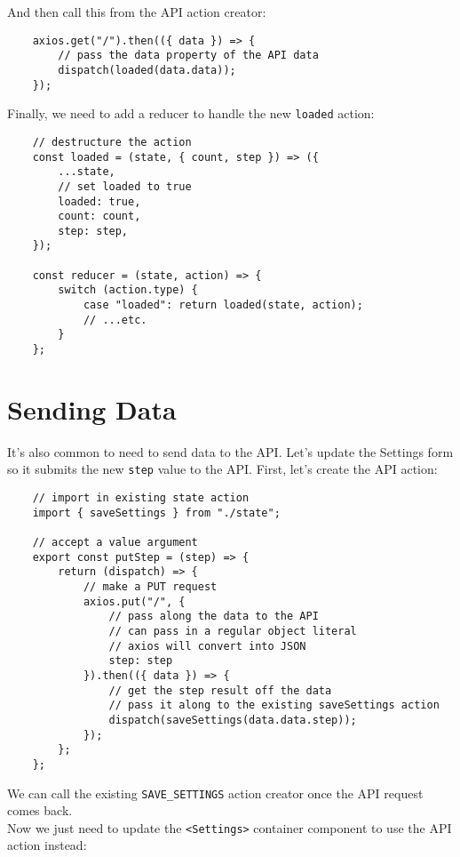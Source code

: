 And then call this from the API action creator:

\begin{verbatim}
    axios.get("/").then(({ data }) => {
        // pass the data property of the API data
        dispatch(loaded(data.data));
    });
\end{verbatim}

Finally, we need to add a reducer to handle the new \texttt{loaded} action:

\begin{verbatim}
    // destructure the action
    const loaded = (state, { count, step }) => ({
        ...state,
        // set loaded to true
        loaded: true,
        count: count,
        step: step,
    });

    const reducer = (state, action) => {
        switch (action.type) {
            case "loaded": return loaded(state, action);
            // ...etc.
        }
    };
\end{verbatim}


\section{Sending Data}

It's also common to need to send data to the API. Let's update the Settings form so it submits the new \texttt{step} value to the API. First, let's create the API action:

\begin{verbatim}
    // import in existing state action
    import { saveSettings } from "./state";

    // accept a value argument
    export const putStep = (step) => {
        return (dispatch) => {
            // make a PUT request
            axios.put("/", {
                // pass along the data to the API
                // can pass in a regular object literal
                // axios will convert into JSON
                step: step
            }).then(({ data }) => {
                // get the step result off the data
                // pass it along to the existing saveSettings action
                dispatch(saveSettings(data.data.step));
            });
        };
    };
\end{verbatim}

We can call the existing \texttt{SAVE_SETTINGS} action creator once the API request comes back.
\\

Now we just need to update the \texttt{<Settings>} container component to use the API action instead:

